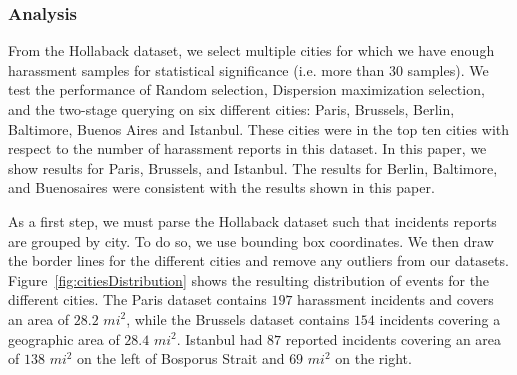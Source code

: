 \documentclass{acm_proc_article-sp}
\begin{document}
\subsubsection{Analysis}
From the Hollaback dataset, we select multiple cities for which we have enough harassment samples for statistical significance (i.e. more than 30 samples). We test the performance of Random selection, Dispersion maximization selection, and the two-stage querying on six different cities: Paris, Brussels, Berlin, Baltimore, Buenos Aires and Istanbul. These cities were in the top ten cities with respect to the number of harassment reports in this dataset. In this paper, we show results for Paris, Brussels, and Istanbul. The results for Berlin, Baltimore, and Buenosaires were consistent with the results shown in this paper. \par
As a first step, we must parse the Hollaback dataset such that incidents reports are grouped by city. To do so, we use bounding box coordinates. We then draw the border lines for the different cities and remove any outliers from our datasets. Figure~\ref{fig:citiesDistribution} shows the resulting distribution of events for the different cities. The Paris dataset contains $197$ harassment incidents and covers an area of $28.2$ $mi^2$, while the Brussels dataset contains $154$ incidents covering a geographic area of $28.4$ $mi^2$. Istanbul had $87$ reported incidents covering an area of $138$ $mi^2$ on the left of Bosporus Strait and $69$ $mi^2$ on the right. \par
\end{document}
